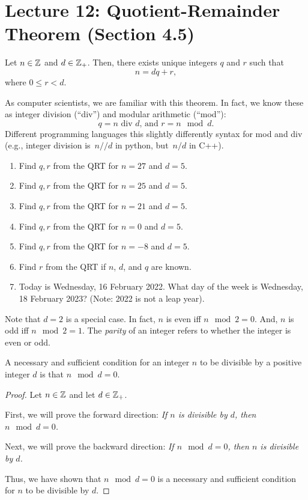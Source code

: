 \section*{Lecture 12: Quotient-Remainder Theorem (Section 4.5)}

\begin{theorem}
    Let $n \in {\mathbb Z}$ and $d \in {\mathbb Z}_{+}$.  Then, there exists unique integers $q$
    and $r$ such that
    $$ n = dq + r, $$
    where $0 \leq r < d$.
\end{theorem}

As computer scientists, we are familiar with this theorem.  In fact, we know
these as integer division (``div'') and modular arithmetic (``mod''):
$$q = n \text{ div } d \text{, and } r= n\mod d. $$
Different programming languages this slightly differently syntax for mod and
div (e.g., integer
division is~$n//d$
in python, but~$n/d$ in C++).



\begin{enumerate}
    \item Find $q,r$ from the QRT for $n=27$ and $d=5$.
        \practice
    \item Find $q,r$ from the QRT for $n=25$ and $d=5$.
        \practice
    \item Find $q,r$ from the QRT for $n=21$ and $d=5$.
        \practice
    \pagebreak
    \item Find $q,r$ from the QRT for $n=0$ and $d=5$.
        \practice
    \item Find $q,r$ from the QRT for $n=-8$ and $d=5$.
        \practice
    \item Find $r$ from the QRT if $n$, $d$, and $q$ are known.
        \practice
    \item Today is Wednesday, 16 February 2022.  What day of the week is
        Wednesday, 18 February 2023? (Note: 2022 is not a leap year).
        \practice
\end{enumerate}

Note that $d=2$ is a special case.  In fact, $n$ is even iff $n \mod
2 = 0$.  And, $n$ is odd iff $n \mod 2 = 1$.  The \emph{parity} of an integer
refers to whether the integer is even or odd.

\begin{theorem}
    A necessary and sufficient condition for an integer $n$ to be divisible by a
    positive integer $d$ is that $n \mod d = 0$.
\end{theorem}
\begin{proof}
    Let $n \in {\mathbb Z}$ and let $d \in {\mathbb Z}_{+}$.

    First, we will prove the forward direction: \emph{If $n$ is divisible by
    $d$, then $n \mod d = 0$.}
    \proofspace

    Next, we will prove the backward direction: \emph{If $n \mod d = 0$,
    then $n$ is divisible by $d$.}
    \proofspace

    Thus, we have shown that $n \mod d = 0$ is a necessary and sufficient
    condition for $n$ to be divisible by $d$.
\end{proof}
